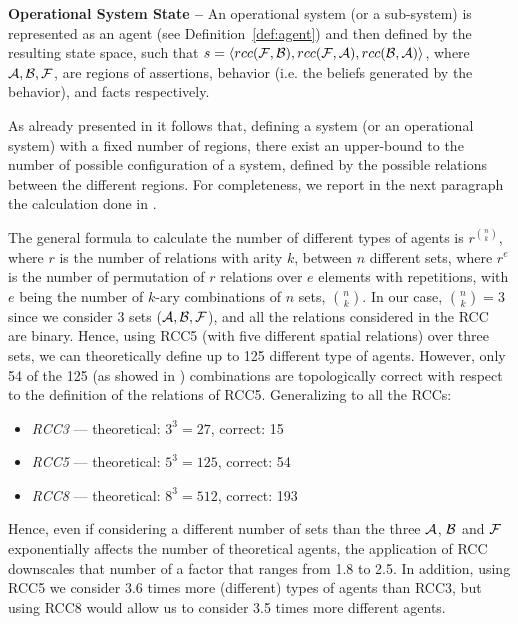 \begin{definition}{\bf Operational System State --}\label{def:opsystem}
	An operational system (or a sub-system) is represented as an agent (see Definition~\ref{def:agent}) and then defined by the resulting state space,
	such that
	$s=\langle rcc(\mathcal{F},\mathcal{B}),rcc(\mathcal{F},\mathcal{A}),rcc(\mathcal{B},\mathcal{A})\rangle$,
	where $\mathcal{A},\mathcal{B},\mathcal{F}$, are regions of assertions, behavior (i.e. the beliefs generated by the behavior), and facts respectively.
\end{definition}

As already presented in \autocite{Santaca2016abf} it follows that, defining
a system (or an operational system) with a fixed number of regions, there exist
an upper-bound to the number of possible configuration of a system, defined by
the possible relations between the different regions.
For completeness, we report in the next paragraph 
the calculation done in \autocite{Santaca2016abf}.

The general formula to calculate the number of different types of agents is
$r^{\binom{n}{k}}$, where $r$ is the number of relations with arity $k$,
between $n$ different sets, where $r^e$ is the number of permutation of $r$
relations over $e$ elements with repetitions, with $e$ being the number of
$k$-ary combinations of $n$ sets, $\binom{n}{k}$.
In our case, $\binom{n}{k}=3$ since we consider $3$ sets
($\mathcal{A},\mathcal{B},\mathcal{F}$), and all the relations
considered in the RCC are binary.  Hence, using RCC5 (with five different
spatial relations) over three sets, we can theoretically define up to 125
different type of agents. However, only 54 of the 125 (as showed in
\cite{improvingRCC}) combinations are topologically correct with respect to
the definition of the relations of RCC5. Generalizing to all the RCCs:

\begin{itemize}%
\item \emph{RCC3} --- theoretical: $3^3=27$,  correct: 15 
\item \emph{RCC5} --- theoretical: $5^3=125$, correct: 54
\item \emph{RCC8} --- theoretical: $8^3=512$, correct: 193
\end{itemize}

Hence, even if considering a different number of sets than the three
$\mathcal{A}$, $\mathcal{B}$ and $\mathcal{F}$ exponentially affects
the number of theoretical agents, the application of RCC downscales that number
of a factor that ranges from 1.8 to 2.5. In addition, using RCC5 we consider
3.6 times more (different) types of agents than RCC3, but using RCC8 would
allow us to consider 3.5 times more different agents.

